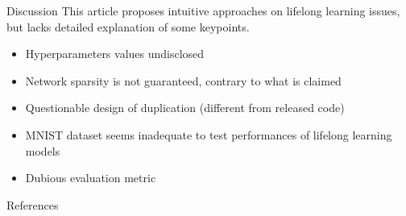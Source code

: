 \documentclass[a0paper,portrait]{baposter}
\begin{document}
\begin{poster}
\begin{posterbox}[name=discussion,column=2,below=TE]{Discussion}
This article proposes intuitive approaches on lifelong learning issues, but lacks detailed explanation of some keypoints.
\begin{itemize}
    \item Hyperparameters values undisclosed
    \item Network sparsity is not guaranteed, contrary to what is claimed
    \item Questionable design of duplication (different from released code)
    \item MNIST dataset seems inadequate to test performances of lifelong learning models
    \item Dubious evaluation metric
\end{itemize}

\end{posterbox}






\begin{posterbox}[name=refs,column=2,above=bottom]{References}





%  
%   
\end{posterbox}

\end{poster}
\end{document}
